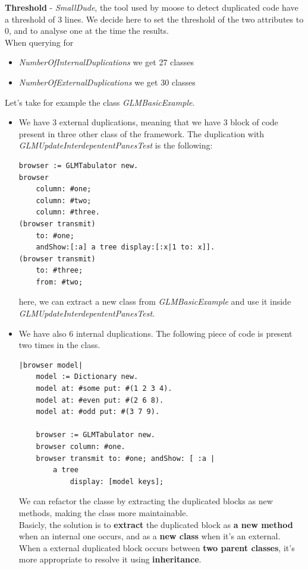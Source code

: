 \documentclass[11pt,a4paper]{article}
\begin{document}
\textbf{Threshold} - \textit{SmallDude}, the tool used by moose to detect duplicated code have a threshold of 3 lines. We decide here to set the threshold of the two attributes to 0, and to analyse one at the time the results.\\

When querying for
\begin{itemize}
\item \textit{NumberOfInternalDuplications} we get 27 classes
\item \textit{NumberOfExternalDuplications} we get 30 classes
\end{itemize}
Let's take for example the class \textit{GLMBasicExample}.
\begin{itemize}
\item We have 3 external duplications, meaning that we have 3 block of code present in three other class of the framework. The duplication with \textit{GLMUpdateInterdepententPanesTest} is the following:
\begin{lstlisting}
browser := GLMTabulator new.
browser
	column: #one;
	column: #two;
	column: #three.
(browser transmit)
	to: #one;
	andShow:[:a] a tree display:[:x|1 to: x]].
(browser transmit)
	to: #three;
	from: #two;
\end{lstlisting}
here, we can extract a new class from \textit{GLMBasicExample} and use it inside \textit{GLMUpdateInterdepententPanesTest}.

\item We have also 6 internal duplications. The following piece of code is present two times in the class.
\begin{lstlisting}
|browser model|
	model := Dictionary new.
	model at: #some put: #(1 2 3 4).
	model at: #even put: #(2 6 8).
	model at: #odd put: #(3 7 9).
	
	browser := GLMTabulator new.
	browser column: #one.
	browser transmit to: #one; andShow: [ :a |
		a tree
			display: [model keys];  
\end{lstlisting}

We can refactor the classe by extracting the duplicated blocks as new methods, making the class more maintainable.\\

Basicly, the solution is to \textbf{extract} the duplicated block as \textbf{a new method} when  an internal one occurs, and as a \textbf{new class} when it's an external. When a external duplicated block occurs between \textbf{two parent classes}, it's more appropriate to resolve it using \textbf{inheritance}. 
\end{itemize}	
\end{document}

